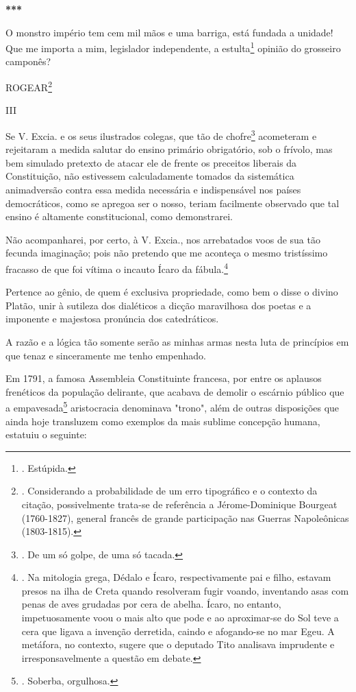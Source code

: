 \textbf{***}

O monstro império tem cem mil mãos e uma barriga, está fundada a
unidade! Que me importa a mim, legislador independente, a
estulta\footnote{. Estúpida.} opinião do grosseiro camponês?

ROGEAR\footnote{. Considerando a probabilidade de um erro tipográfico e
  o contexto da citação, possivelmente trata-se de referência a
  Jérome-Dominique Bourgeat (1760-1827), general francês de grande
  participação nas Guerras Napoleônicas (1803-1815).}

III

Se V. Excia. e os seus ilustrados colegas, que tão de chofre\footnote{.
  De um só golpe, de uma só tacada.} acometeram e rejeitaram a medida
salutar do ensino primário obrigatório, sob o frívolo, mas bem simulado
pretexto de atacar ele de frente os preceitos liberais da Constituição,
não estivessem calculadamente tomados da sistemática animadversão contra
essa medida necessária e indispensável nos países democráticos, como se
apregoa ser o nosso, teriam facilmente observado que tal ensino é
altamente constitucional, como demonstrarei.

Não acompanharei, por certo, à V. Excia., nos arrebatados voos de sua
tão fecunda imaginação; pois não pretendo que me aconteça o mesmo
tristíssimo fracasso de que foi vítima o incauto Ícaro da
fábula.\footnote{. Na mitologia grega, Dédalo e Ícaro, respectivamente
  pai e filho, estavam presos na ilha de Creta quando resolveram fugir
  voando, inventando asas com penas de aves grudadas por cera de abelha.
  Ícaro, no entanto, impetuosamente voou o mais alto que pode e ao
  aproximar-se do Sol teve a cera que ligava a invenção derretida,
  caindo e afogando-se no mar Egeu. A metáfora, no contexto, sugere que
  o deputado Tito analisava imprudente e irresponsavelmente a questão em
  debate.}

Pertence ao gênio, de quem é exclusiva propriedade, como bem o disse o
divino Platão, unir à sutileza dos dialéticos a dicção maravilhosa dos
poetas e a imponente e majestosa pronúncia dos catedráticos.

A razão e a lógica tão somente serão as minhas armas nesta luta de
princípios em que tenaz e sinceramente me tenho empenhado.

Em 1791, a famosa Assembleia Constituinte francesa, por entre os
aplausos frenéticos da população delirante, que acabava de demolir o
escárnio público que a empavesada\footnote{. Soberba, orgulhosa.}
aristocracia denominava "trono", além de outras disposições que ainda
hoje transluzem como exemplos da mais sublime concepção humana, estatuiu
o seguinte:

